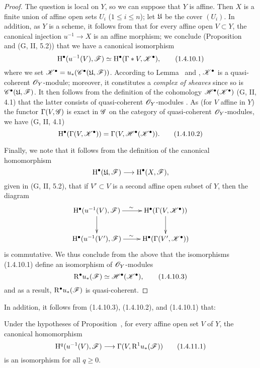 \begin{proof}
\label{proof-3.1.4.10}
The question is local on $Y$, so we can suppose that $Y$ is affine.
Then $X$ is a finite union of affine open sets $U_i$ ($1\leq i\leq n$); let $\mathfrak{U}$ be the cover $(U_i)$.
In addition, as $Y$ is a scheme, it follows from  that for every affine open $V\subset Y$, the canonical injection $u^{-1}\to X$ is an affine morphism; we conclude (Proposition~ and (G, II, 5.2)) that we have a canonical isomorphism
\[
  \mathrm{H}^\bullet(u^{-1}(V),\mathscr{F})\simeq\mathrm{H}^\bullet(\Gamma*V,\mathscr{K}^\bullet),
  \tag{1.4.10.1}
\]
where we set $\mathscr{K}^\bullet=u_*(\mathscr{C}^\bullet(\mathfrak{U},\mathscr{F}))$.
According to Lemma~ and , $\mathscr{K}^\bullet$ is a quasi-coherent $\mathscr{O}_Y$-module; moreover, it constitutes a \emph{complex of sheaves} since so is $\mathscr{C}^\bullet(\mathfrak{U},\mathscr{F})$.
It then follows from the definition of the cohomology $\mathscr{H}^\bullet(\mathscr{K}^\bullet)$ (G, II, 4.1) that the latter consists of quasi-coherent $\mathscr{O}_Y$-modules .
As (for $V$ affine in $Y$) the functor $\Gamma(V,\mathscr{G})$ is exact in $\mathscr{G}$ on the category of quasi-coherent $\mathscr{O}_Y$-modules, we have (G, II, 4.1)
\[
  \mathrm{H}^\bullet(\Gamma(V,\mathscr{K}^\bullet))=\Gamma(V,\mathscr{H}^\bullet(\mathscr{K}^\bullet)).
  \tag{1.4.10.2}
\]

Finally, we note that it follows from the definition of the canonical homomorphism
\[
  \HH^\bullet(\fk{U},\sh{F})\to\HH^\bullet(X,\sh{F}),
\]
given in (G, II, 5.2), that if $V'\subset V$ is a second affine open subset of $Y$, then the
diagram
\[
  \xymatrix{
    \HH^\bullet(u^{-1}(V),\sh{F})\ar[r]^\sim\ar[d] &
    \HH^\bullet(\Gamma(V,\sh{K}^\bullet))\ar[d]\\
    \HH^\bullet(u^{-1}(V'),\sh{F})\ar[r]^\sim &
    \HH^\bullet(\Gamma(V',\sh{K}^\bullet))
  }
\]
is commutative.
We thus conclude from the above that the isomorphisms (1.4.10.1) define an isomorphism of $\mathscr{O}_Y$-modules
\[
  \mathrm{R}^\bullet u_*(\mathscr{F})\simeq\mathscr{H}^\bullet(\mathscr{K}^\bullet),
  \tag{1.4.10.3}
\]
and as a result, $\mathrm{R}^\bullet u_*(\mathscr{F})$ is quasi-coherent.
\end{proof}

In addition, it follows from (1.4.10.3), (1.4.10.2), and (1.4.10.1) that:
\begin{cor}[1.4.11]
\label{3.1.4.11}
Under the hypotheses of Proposition~, for every affine open set $V$ of $Y$, the canonical homomorphism
\[
  \HH^q(u^{-1}(V),\sh{F})\to\Gamma(V,\RR^1 u_*(\sh{F}))
  \tag{1.4.11.1}
\]
is an isomorphism for all $q\geq 0$.
\end{cor}

